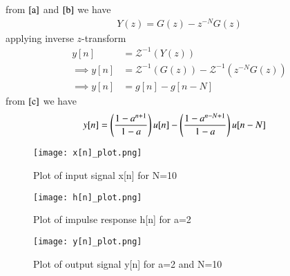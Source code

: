 \documentclass[journal,12pt,twocolumn]{IEEEtran}
\begin{document}
from $\eqref{a}$ and $\eqref{b}$ we have
\begin{align}
    Y(z) = G(z)-z^{-N}G(z)
\end{align}
applying inverse $z$-transform
\begin{align}
    y[n] &= \mathcal{Z}^{-1}(Y(z))\\
    \implies y[n] &= \mathcal{Z}^{-1}(G(z))-\mathcal{Z}^{-1}(z^{-N}G(z))\\
    \implies y[n] &= g[n]-g[n-N]
\end{align}
from $\eqref{c}$ we have
\begin{align}
    y[n] &= \left(\frac{1-a^{n+1}}{1-a}\right)u[n]-\left(\frac{1-a^{n-N+1}}{1-a}\right)u[n-N]
\end{align}
\begin{figure}[!ht]
    \centering
    \texttt{[image: x[n]\_plot.png]}
    \caption{Plot of input signal x[n] for N=10}
    \label{x[n]_plot}
\end{figure}
\begin{figure}[!ht]
    \centering
    \texttt{[image: h[n]\_plot.png]}
    \caption{Plot of impulse response h[n] for a=2}
    \label{h[n]_plot}
\end{figure}
\begin{figure}[H]
    \centering
    \texttt{[image: y[n]\_plot.png]}
    \caption{Plot of output signal y[n] for a=2 and N=10}
    \label{y[n]_plot}
\end{figure}
\end{document}
